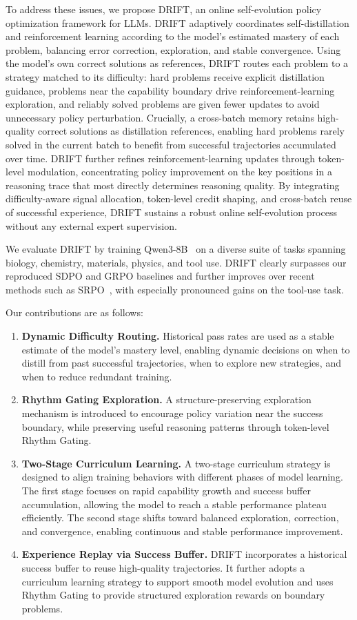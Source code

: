 \documentclass{article}
\begin{document}
To address these issues, we propose DRIFT, an online self-evolution policy optimization framework for LLMs. DRIFT adaptively coordinates self-distillation and reinforcement learning according to the model's estimated mastery of each problem, balancing error correction, exploration, and stable convergence. Using the model's own correct solutions as references, DRIFT routes each problem to a strategy matched to its difficulty: hard problems receive explicit distillation guidance, problems near the capability boundary drive reinforcement-learning exploration, and reliably solved problems are given fewer updates to avoid unnecessary policy perturbation. Crucially, a cross-batch memory retains high-quality correct solutions as distillation references, enabling hard problems rarely solved in the current batch to benefit from successful trajectories accumulated over time. DRIFT further refines reinforcement-learning updates through token-level modulation, concentrating policy improvement on the key positions in a reasoning trace that most directly determines reasoning quality. By integrating difficulty-aware signal allocation, token-level credit shaping, and cross-batch reuse of successful experience, DRIFT sustains a robust online self-evolution process without any external expert supervision.

We evaluate DRIFT by training Qwen3-8B~\citep{qwen3} on a diverse suite of tasks spanning biology, chemistry, materials, physics, and tool use. DRIFT clearly surpasses our reproduced SDPO and GRPO baselines and further improves over recent methods such as SRPO~\citep{li2026srpo}, with especially pronounced gains on the tool-use task.

Our contributions are as follows:
\begin{enumerate}
    \item \textbf{Dynamic Difficulty Routing.} Historical pass rates are used as a stable estimate of the model's mastery level, enabling dynamic decisions on when to distill from past successful trajectories, when to explore new strategies, and when to reduce redundant training.
    \item \textbf{Rhythm Gating Exploration.} A structure-preserving exploration mechanism is introduced to encourage policy variation near the success boundary, while preserving useful reasoning patterns through token-level Rhythm Gating.
    \item \textbf{Two-Stage Curriculum Learning.} A two-stage curriculum strategy is designed to align training behaviors with different phases of model learning. The first stage focuses on rapid capability growth and success buffer accumulation, allowing the model to reach a stable performance plateau efficiently. The second stage shifts toward balanced exploration, correction, and convergence, enabling continuous and stable performance improvement.
    \item \textbf{Experience Replay via Success Buffer.} DRIFT incorporates a historical success buffer to reuse high-quality trajectories. It further adopts a curriculum learning strategy to support smooth model evolution and uses Rhythm Gating to provide structured exploration rewards on boundary problems.
\end{enumerate}
\end{document}
